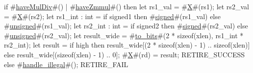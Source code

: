 if #\hyperref[sailRISCVzhaveMulDiv]{haveMulDiv}#() | #\hyperref[sailRISCVzhaveZmmul]{haveZmmul}#() then {
  let rs1_val = #\hyperref[sailRISCVzX]{X}#(rs1);
  let rs2_val = #\hyperref[sailRISCVzX]{X}#(rs2);
  let rs1_int : int = if signed1 then #\hyperref[sailRISCVzsigned]{signed}#(rs1_val) else #\hyperref[sailRISCVzunsigned]{unsigned}#(rs1_val);
  let rs2_int : int = if signed2 then #\hyperref[sailRISCVzsigned]{signed}#(rs2_val) else #\hyperref[sailRISCVzunsigned]{unsigned}#(rs2_val);
  let result_wide = #\hyperref[sailRISCVztozybits]{to\_bits}#(2 * sizeof(xlen), rs1_int * rs2_int);
  let result = if   high
               then result_wide[(2 * sizeof(xlen) - 1) .. sizeof(xlen)]
               else result_wide[(sizeof(xlen) - 1) .. 0];
  #\hyperref[sailRISCVzX]{X}#(rd) = result;
  RETIRE_SUCCESS
} else {
  #\hyperref[sailRISCVzhandlezyillegal]{handle\_illegal}#();
  RETIRE_FAIL
}
